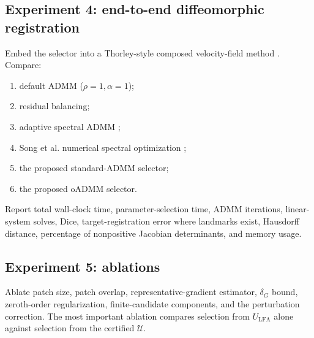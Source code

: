 \documentclass[11pt]{article}
\theoremstyle{definition}
\begin{document}
\subsection{Experiment 4: end-to-end diffeomorphic registration}
Embed the selector into a Thorley-style composed velocity-field method \cite{Thorley2021}. Compare:
\begin{enumerate}[leftmargin=2em]
\item default ADMM ($\rho=1,\alpha=1$);
\item residual balancing;
\item adaptive spectral ADMM \cite{Xu2017};
\item Song et al. numerical spectral optimization \cite{Song2024};
\item the proposed standard-ADMM selector;
\item the proposed oADMM selector.
\end{enumerate}

Report total wall-clock time, parameter-selection time, ADMM iterations, linear-system solves, Dice, target-registration error where landmarks exist, Hausdorff distance, percentage of nonpositive Jacobian determinants, and memory usage.

\begin{table}[h]
\centering
\caption{Placeholder: end-to-end registration results.}
\end{table}

\subsection{Experiment 5: ablations}
Ablate patch size, patch overlap, representative-gradient estimator, $\delta_G$ bound, zeroth-order regularization, finite-candidate components, and the perturbation correction. The most important ablation compares selection from $U_{\mathrm{LFA}}$ alone against selection from the certified $\mathcal U$.
\end{document}
